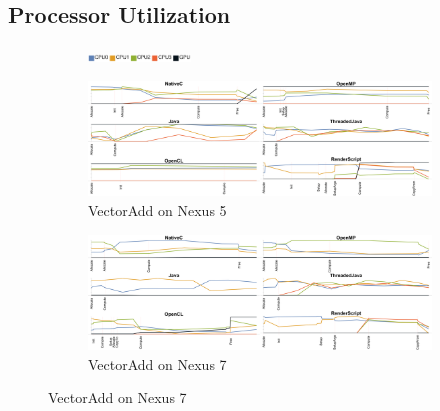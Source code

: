 \subsection{Processor Utilization}


\begin{figure}
  \centering

  \begin{subfigure}[b]{\textwidth}
          \centering
          \includegraphics[width=0.3\textwidth]{data/load_legend.pdf}
  \end{subfigure}

  \begin{subfigure}[b]{0.85\textwidth}
       \centering
       \includegraphics[width=\textwidth]{data/load_vectoradd_nexus5.pdf}
       \vspace{-5mm}
       \caption{VectorAdd on Nexus 5}\label{fig:Vecadd5}
   \end{subfigure}

  \begin{subfigure}[b]{0.85\textwidth}
       \centering
       \includegraphics[width=\textwidth]{data/load_vectoradd_nexus7.pdf}
       \vspace{-5mm}
       \caption{VectorAdd on Nexus 7}\label{fig:Vecadd7}
   \end{subfigure}


\end{figure}
